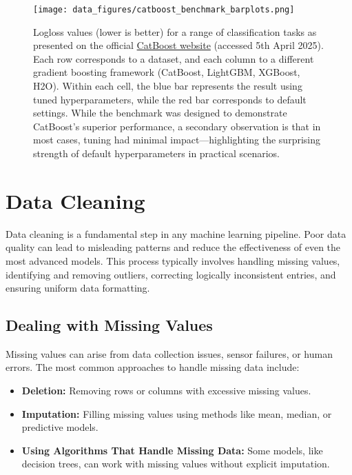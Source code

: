 \documentclass[12pt,openany]{book}
\begin{document}
\begin{figure}[H]
    \centering
    \texttt{[image: data\_figures/catboost\_benchmark\_barplots.png]}
    \caption{
    Logloss values (lower is better) for a range of classification tasks as presented on the official \href{https://catboost.ai/}{CatBoost website} (accessed 5th April 2025). Each row corresponds to a dataset, and each column to a different gradient boosting framework (CatBoost, LightGBM, XGBoost, H2O). Within each cell, the blue bar represents the result using tuned hyperparameters, while the red bar corresponds to default settings. While the benchmark was designed to demonstrate CatBoost’s superior performance, a secondary observation is that in most cases, tuning had minimal impact—highlighting the surprising strength of default hyperparameters in practical scenarios.
    }
    \label{fig:catboost-benchmark}
\end{figure}





\section{Data Cleaning}

Data cleaning is a fundamental step in any machine learning pipeline. Poor data quality can lead to misleading patterns and reduce the effectiveness of even the most advanced models. This process typically involves handling missing values, identifying and removing outliers, correcting logically inconsistent entries, and ensuring uniform data formatting. \newline

\subsection{Dealing with Missing Values}
Missing values can arise from data collection issues, sensor failures, or human errors. The most common approaches to handle missing data include:

\begin{itemize}
    \item \textbf{Deletion:} Removing rows or columns with excessive missing values.
    \item \textbf{Imputation:} Filling missing values using methods like mean, median, or predictive models.
    \item \textbf{Using Algorithms That Handle Missing Data:} Some models, like decision trees, can work with missing values without explicit imputation.
\end{itemize}
\end{document}
